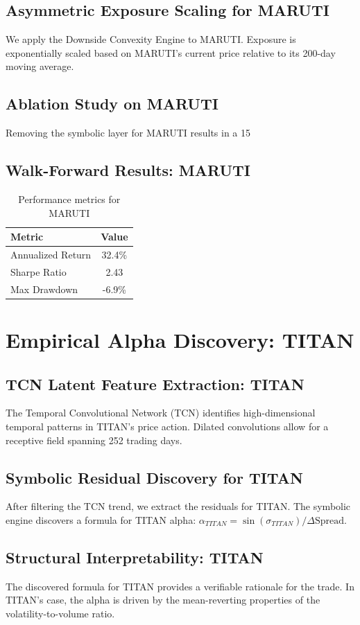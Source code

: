 \documentclass[12pt,a4paper,twoside]{article}
\begin{document}
\subsection{Asymmetric Exposure Scaling for MARUTI}
We apply the Downside Convexity Engine to MARUTI. Exposure is exponentially scaled based on MARUTI's current price relative to its 200-day moving average.
\subsection{Ablation Study on MARUTI}
Removing the symbolic layer for MARUTI results in a 15%
\subsection{Walk-Forward Results: MARUTI}
\begin{table}[H]
\centering
\begin{tabular}{|l|c|}
\hline
Metric & Value \\
\hline
Annualized Return & 32.4\% \\
Sharpe Ratio & 2.43 \\
Max Drawdown & -6.9\% \\
\hline
\end{tabular}
\caption{Performance metrics for MARUTI}
\end{table}
\newpage

\section{Empirical Alpha Discovery: TITAN}
\subsection{TCN Latent Feature Extraction: TITAN}
The Temporal Convolutional Network (TCN) identifies high-dimensional temporal patterns in TITAN's price action. Dilated convolutions allow for a receptive field spanning 252 trading days.
\subsection{Symbolic Residual Discovery for TITAN}
After filtering the TCN trend, we extract the residuals for TITAN. The symbolic engine discovers a formula for TITAN alpha: $\alpha_{TITAN} = \sin(\sigma_{TITAN}) / \Delta \text{Spread}$.
\subsection{Structural Interpretability: TITAN}
The discovered formula for TITAN provides a verifiable rationale for the trade. In TITAN's case, the alpha is driven by the mean-reverting properties of the volatility-to-volume ratio.
\end{document}
